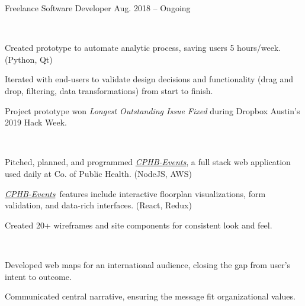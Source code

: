 \newcommand*{\cphbevts}[0]{\href{https://cphb-events.public-health.uiowa.edu/}{\textit{CPHB-Events}}}

\begin{cventries}
  \cventry
    {}
    {Freelance Software Developer}
    {Aug. 2018 -- Ongoing}
    {}
    {%
      \vspace{-1.4\baselineskip}
      \begin{cvitems}
        \item {\\
          \begin{projectitems}
            \item [\textendash] {Created prototype to automate analytic process, saving users 5 hours/week. (Python, Qt)}
            \item [\textendash] {Iterated with end-users to validate design decisions and functionality (drag and drop, filtering, data transformations) from start to finish.}
            \item [\textendash] {Project prototype won \textit{Longest Outstanding Issue Fixed} during Dropbox Austin's 2019 Hack Week.}
          \end{projectitems}
        }
        \item {\\
          \begin{projectitems}
            \item [\textendash] {Pitched, planned, and programmed \cphbevts, a full stack web application used daily at Co. of Public Health. (NodeJS, AWS)}
            \item [\textendash] {\cphbevts\ features include interactive floorplan visualizations, form validation, and data-rich interfaces. (React, Redux)}
            \item [\textendash] {Created 20+ wireframes and site components for consistent look and feel.}
          \end{projectitems}
        }
        \item {\\
          \begin{projectitems}
            \item [\textendash] {Developed web maps for an international audience, closing the gap from user's intent to outcome.}
            \item [\textendash] {Communicated central narrative, ensuring the message fit organizational values.}
          \end{projectitems}
        }
      \end{cvitems}
  }


\end{cventries}
